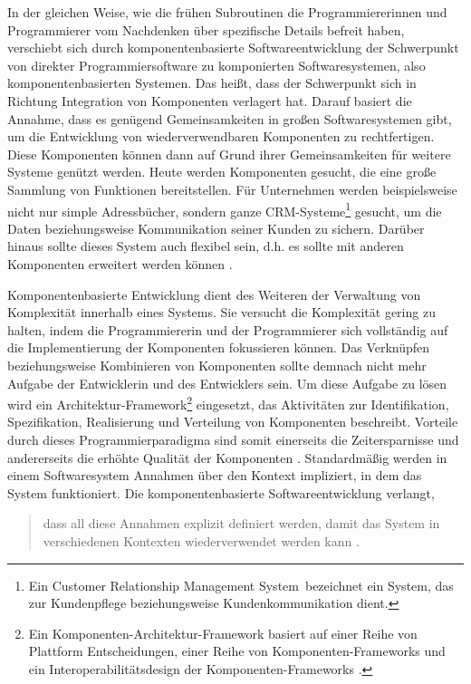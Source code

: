 In der gleichen Weise, wie die frühen Subroutinen die Programmiererinnen und Programmierer vom Nachdenken über spezifische Details befreit haben, verschiebt sich durch komponentenbasierte Softwareentwicklung der Schwerpunkt von direkter Programmiersoftware zu komponierten Softwaresystemen, also komponentenbasierten Systemen. Das heißt, dass der Schwerpunkt sich in Richtung Integration von Komponenten verlagert hat. Darauf basiert die Annahme, dass es genügend Gemeinsamkeiten in  großen Softwaresystemen gibt, um die Entwicklung von wiederverwendbaren Komponenten zu rechtfertigen. Diese Komponenten können dann auf Grund ihrer Gemeinsamkeiten für weitere Systeme genützt werden. Heute werden Komponenten gesucht, die eine große Sammlung von Funktionen bereitstellen. Für Unternehmen werden beispielsweise nicht nur simple Adressbücher, sondern ganze CRM-Systeme\footnote{Ein \glqq Customer Relationship Management System\grqq\ bezeichnet ein System, das zur Kundenpflege beziehungsweise Kundenkommunikation dient.} gesucht, um die Daten beziehungsweise Kommunikation seiner Kunden zu sichern. Darüber hinaus sollte dieses System auch flexibel sein, d.h. es sollte mit anderen Komponenten erweitert werden können \citereset \autocite[siehe][S. 17-25]{Andresen.2003}.

Komponentenbasierte Entwicklung dient des Weiteren der Verwaltung von Komplexität innerhalb eines Systems. Sie versucht die Komplexität gering zu halten, indem die Programmiererin und der Programmierer sich vollständig auf die Implementierung der Komponenten fokussieren können. Das Verknüpfen beziehungsweise Kombinieren von Komponenten sollte demnach nicht mehr Aufgabe der Entwicklerin und des Entwicklers sein. Um diese Aufgabe zu lösen wird ein Architektur-Framework\footnote{Ein Komponenten-Architektur-Framework basiert auf einer Reihe von Plattform Entscheidungen, einer Reihe von Komponenten-Frameworks und ein Interoperabilitätsdesign der Komponenten-Frameworks \citereset \autocite[siehe][419-422]{Szyperski.2002}.} eingesetzt, das Aktivitäten zur Identifikation, Spezifikation, Realisierung und Verteilung von Komponenten beschreibt. Vorteile durch dieses Programmierparadigma sind somit einerseits die Zeitersparnisse und andererseits die erhöhte Qualität der Komponenten \citereset \autocite[siehe][S. 1-3]{Andresen.2003}. Standardmäßig werden in einem Softwaresystem Annahmen über den Kontext impliziert, in dem das System funktioniert. Die komponentenbasierte Softwareentwicklung verlangt,
\begin{quote}
  \glqq dass all diese Annahmen explizit definiert werden, damit das System in verschiedenen Kontexten wiederverwendet werden kann \citereset \autocite[siehe][]{Andresen.2003}.\grqq
\end{quote}


